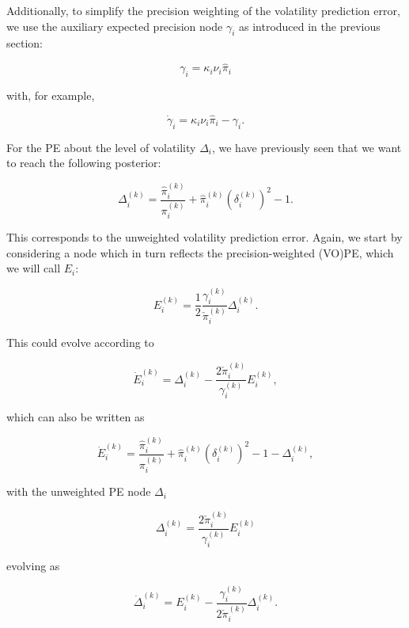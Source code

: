 Additionally, to simplify the precision weighting of the volatility prediction error, we use the auxiliary expected precision node $\gamma_i$ as introduced in the previous section:

\begin{equation}
  \gamma_i = \kappa_i \nu_i \hat{\pi}_i
\end{equation}

with, for example, 

\begin{equation}
  \dot{\gamma}_i = \kappa_i \nu_i \hat{\pi}_i - \gamma_i.
\end{equation}

For the \textsf{PE} about the level of volatility $\Delta_i$, we have previously seen that we want to reach the following posterior:

\begin{equation}
	\Delta_i^{(k)} = \frac{\hat{\pi}_i^{(k)}}{\pi_{i}^{(k)}} + \hat{\pi}_i^{(k)} (\delta_i^{(k)})^2 - 1.
\end{equation}

This corresponds to the unweighted volatility prediction error. Again, we start by considering a node which in turn reflects the precision-weighted (VO)PE, which we will call $E_i$:

\begin{equation}
	E_i^{(k)} = \frac{1}{2} \frac{\gamma_i^{(k)}}{\check{\pi}_i^{(k)}} \Delta_i^{(k)}.
\end{equation}

This could evolve according to 

\begin{equation}
	\dot{E}_i^{(k)} = \Delta_i^{(k)} - \frac{2 \check{\pi}_i^{(k)}}{\gamma_i^{(k)}} E_i^{(k)},
\end{equation}

which can also be written as 

\begin{equation}
	\dot{E}_i^{(k)} = \frac{\hat{\pi}_i^{(k)}}{\pi_{i}^{(k)}} + \hat{\pi}_i^{(k)} (\delta_i^{(k)})^2 - 1 - \Delta_i^{(k)},
\end{equation}

with the unweighted PE node $\Delta_i$

\begin{equation}
	\Delta_i^{(k)} = \frac{2 \check{\pi}_i^{(k)}}{\gamma_i^{(k)}} E_i^{(k)}
\end{equation}

evolving as 

\begin{equation}
	\dot{\Delta}_i^{(k)} = E_i^{(k)} - \frac{\gamma_i^{(k)}}{2 \check{\pi}_i^{(k)}} \Delta_i^{(k)}.
\end{equation}

